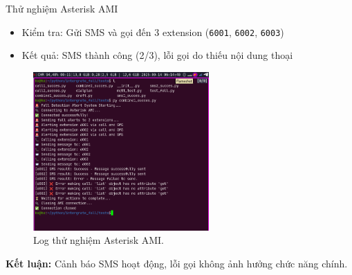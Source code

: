 \begin{frame}{Thử nghiệm Asterisk AMI}
    \begin{itemize}
        \item Kiểm tra: Gửi SMS và gọi đến 3 extension (\texttt{6001}, \texttt{6002}, \texttt{6003})
        \item Kết quả: SMS thành công (2/3), lỗi gọi do thiếu nội dung thoại
    \end{itemize}
    \begin{figure}
        \centering
        \includegraphics[width=0.6\textwidth]{images/ast_call_sms_test.png}
        \caption{Log thử nghiệm Asterisk AMI.}
    \end{figure}
    \textbf{Kết luận:} Cảnh báo SMS hoạt động, lỗi gọi không ảnh hưởng chức năng chính.
\end{frame}

